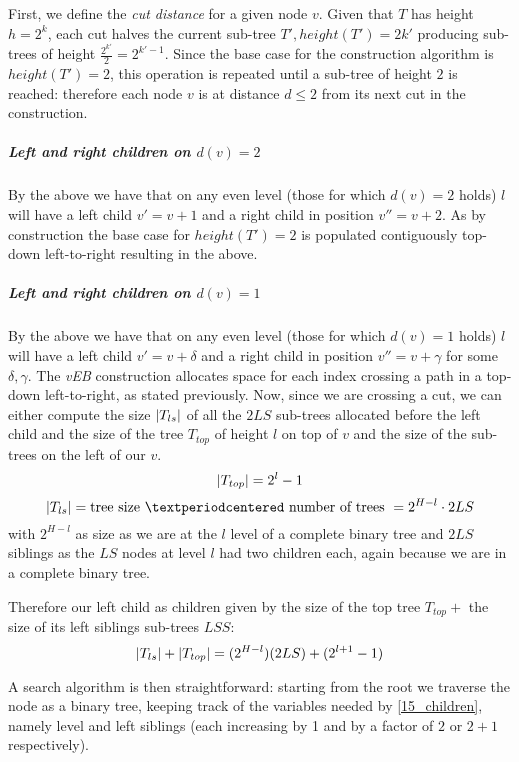 First, we define the \emph{cut distance} for a given node $v$.
Given that $T$ has height $h = 2^k$, each cut halves the current sub-tree $T', height(T') = 2{k'}$ producing sub-trees of height $\frac{2^{k'}}{2} = 2^{{k'} - 1}$.
Since the base case for the construction algorithm is $height(T') = 2$, this operation is repeated until a sub-tree of height $2$ is reached: therefore each node $v$ is at distance $d \leq 2$ from its next cut in the construction.
\subparagraph{Left and right children on $d(v) = 2$} By the above we have that on any even level (those for which $d(v) = 2$ holds) $l$ will have a left child $v' = v + 1$ and a right child in position $v'' = v + 2$.
As by construction the base case for $height(T') = 2$ is populated contiguously top-down left-to-right resulting in the above.
\subparagraph{Left and right children on $d(v) = 1$} By the above we have that on any even level (those for which $d(v) = 1$ holds) $l$ will have a left child $v' = v + \delta$ and a right child in position $v'' = v + \gamma$ for some $\delta, \gamma$.
The \emph{vEB} construction allocates space for each index crossing a path in a top-down left-to-right, as stated previously.
Now, since we are crossing a cut, we can either compute the size $\lvert T_{ls}\rvert$ of all the $2LS$ sub-trees allocated before the left child and the size of the tree $T_{top}$ of height $l$ on top of $v$ and the size of the sub-trees on the left of our $v$.
\begin{equation} \label{15_top_size}
\lvert T_{top}\rvert = 2^{l} - 1
\end{equation}
\begin{equation} \label{15_left_sub-trees_siblings}
\abs{T_{ls}} = \text{tree size } · \text{ number of trees }= 2^{H - l} \cdot 2LS
\end{equation}
with $2^{H - l}$ as size as we are at the $l$ level of a complete binary tree and $2LS$ siblings as the $LS$ nodes at level $l$ had two children each, again because we are in a complete binary tree.

Therefore our left child as children given by the size of the top tree $T_{top} + $ the size of its left siblings sub-trees $LSS$:
\begin{equation} \label{15_children}
\lvert T_{ls}\rvert + \lvert T_{top}\rvert = (2^{H - l})(2LS) + (2^{l+1} - 1)
\end{equation}

A search algorithm is then straightforward: starting from the root we traverse the node as a binary tree, keeping track of the variables needed by \ref{15_children}, namely level and left siblings (each increasing by 1 and by a factor of $2$ or $2 + 1$ respectively).


